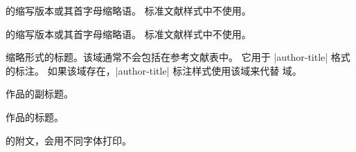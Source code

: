 \begin{fieldlist}


 的缩写版本或其首字母缩略语。
标准文献样式中不使用。




 的缩写版本或其首字母缩略语。
标准文献样式中不使用。




缩略形式的标题。该域通常不会包括在参考文献表中。
它用于 |author-title| 格式的标注。
如果该域存在，|author-title| 标注样式使用该域来代替  域。




作品的副标题。




作品的标题。




 的附文，会用不同字体打印。




\end{fieldlist}
